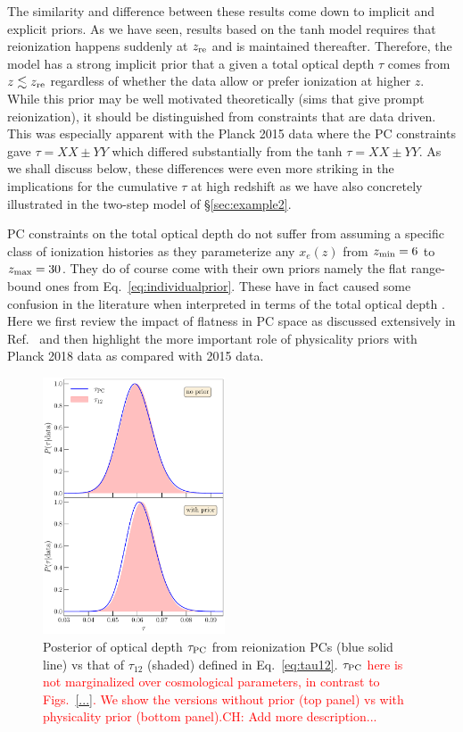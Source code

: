 \documentclass[prd,twocolumn,amsmath,amssymb,floatfix,superscriptaddress,nofootinbib]{revtex4-1}
\newcommand{\ch}[1]{\textcolor{red}{#1}}
\begin{document}
The similarity and difference between these results come down to implicit and explicit priors. As we have seen, 
results based on the tanh model requires that reionization happens suddenly at $z_{\rm re}$ and is maintained thereafter.   Therefore, the model has a strong implicit prior that a given a total optical depth $\tau$ comes from $z\lesssim z_{\rm re}$ regardless of whether the data allow or prefer
ionization at higher $z$.  While this prior may be well motivated
theoretically \cite{XX} (sims that give prompt reionization), it should be distinguished from constraints that are data driven.  
This was especially apparent with the Planck 2015 data where
the PC constraints gave $\tau=XX\pm YY$ which differed substantially from the tanh $\tau=XX\pm YY$.  As we shall discuss
below, these differences were even more striking in the implications for the cumulative $\tau$ at high redshift as we have also concretely illustrated in the two-step model of \S \ref{sec:example2}.

PC constraints on the total optical depth do not suffer from assuming a specific class of ionization histories as they parameterize any $x_e(z)$ from $z_{\rm min}=6$ to $z_{\rm max}=30$.
They do of course come with their own priors namely the flat
range-bound ones from Eq.~\eqref{eq:individualprior}.
These have in fact caused some confusion in the literature when interpreted in terms of the total optical depth \cite{Millea:2018bko}.  Here we first review the impact of flatness in PC space as discussed extensively in Ref.~\cite{Heinrich:2018btc} and then highlight the more important role of physicality priors with Planck 2018 data as compared with
2015 data.


\begin{figure}[ht]
\includegraphics[width=0.48\textwidth]{paper/plots/plot_tau12_new_apply_cut_False_vs_True_pl18_pc_zmax30_pliklite_srollv2_1015_two_panels.pdf}
\caption{Posterior of optical depth $\tau_{\rm PC}$ from reionization PCs (blue solid line) vs that of $\tau_{12}$ (shaded) defined in Eq.~\ref{eq:tau12}. \ch{$\tau_{\rm PC}$ here is not marginalized over cosmological parameters, in contrast to Figs.~\ref{...}. We show the versions without prior (top panel) vs with physicality prior (bottom panel).}\ch{CH: Add more description...}}
\label{fig:tau12}
\end{figure}
\end{document}
